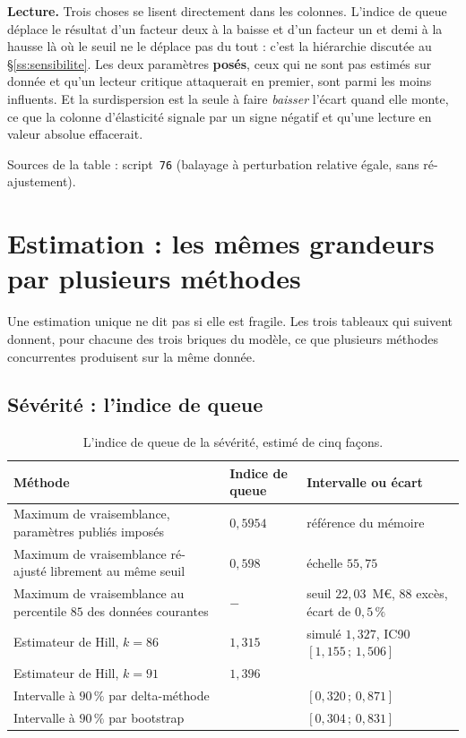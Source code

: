 \documentclass[12pt,a4paper]{article}
\theoremstyle{definition}
\begin{document}
\textbf{Lecture.} Trois choses se lisent directement dans les colonnes. L'indice de
queue déplace le résultat d'un facteur deux à la baisse et d'un facteur un et demi
à la hausse là où le seuil ne le déplace pas du tout : c'est la hiérarchie discutée
au \S\ref{ss:sensibilite}. Les deux paramètres \textbf{posés}, ceux qui ne sont pas
estimés sur donnée et qu'un lecteur critique attaquerait en premier, sont parmi les
moins influents. Et la surdispersion est la seule à faire \emph{baisser} l'écart
quand elle monte, ce que la colonne d'élasticité signale par un signe négatif et
qu'une lecture en valeur absolue effacerait.

\vspace{4pt}
\noindent Sources de la table : script~\texttt{76} (balayage à perturbation
relative égale, sans ré-ajustement).

\section{Estimation : les mêmes grandeurs par plusieurs méthodes}
\label{ann:methodes}

Une estimation unique ne dit pas si elle est fragile. Les trois tableaux qui
suivent donnent, pour chacune des trois briques du modèle, ce que plusieurs
méthodes concurrentes produisent sur la même donnée.

\subsection*{Sévérité : l'indice de queue}

\begin{table}[htbp]
\centering\small
\renewcommand{\arraystretch}{1.2}
\begin{tabular}{@{}>{\raggedright\arraybackslash}p{6.6cm}>{\raggedright\arraybackslash}p{3.0cm}>{\raggedright\arraybackslash}p{3.6cm}@{}}
\toprule
\textbf{Méthode} & \textbf{Indice de queue} & \textbf{Intervalle ou écart} \\
\midrule
Maximum de vraisemblance, paramètres publiés imposés &
$0{,}5954$ & référence du mémoire \\
Maximum de vraisemblance ré-ajusté librement au même seuil &
$0{,}598$ & échelle $55{,}75$ \\
Maximum de vraisemblance au percentile $85$ des données courantes &
$-$ & seuil $22{,}03$~M\euro, $88$ excès, écart de $0{,}5\,\%$ \\
Estimateur de Hill, $k = 86$ &
$1{,}315$ & simulé $1{,}327$, IC90 $[1{,}155\,;\,1{,}506]$ \\
Estimateur de Hill, $k = 91$ &
$1{,}396$ & \\
\midrule
Intervalle à $90\,\%$ par delta-méthode & & $[0{,}320\,;\,0{,}871]$ \\
Intervalle à $90\,\%$ par bootstrap & & $[0{,}304\,;\,0{,}831]$ \\
\bottomrule
\end{tabular}
\caption{L'indice de queue de la sévérité, estimé de cinq façons.}
\label{tab:severite-methodes}
\end{table}
\end{document}
